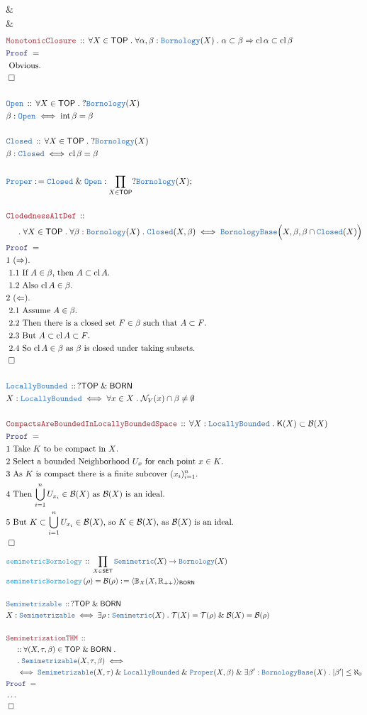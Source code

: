 \documentclass[12pt]{scrartcl}
\newcommand{\TYPE}[1]{\textcolor{NavyBlue}{\mathtt{#1}}}
\newcommand{\FUNC}[1]{\textcolor{Cerulean}{\mathtt{#1}}}
\newcommand{\LOGIC}[1]{\textcolor{Blue}{\mathtt{#1}}}
\newcommand{\THM}[1]{\textcolor{Maroon}{\mathtt{#1}}}
\renewcommand{\.}{\; . \;}
\newcommand{\de}{: \kern 0.1pc =}
\newcommand{\Act}[1]{\left( #1 \right)}
\newcommand{\Theorem}[2]{& \THM{#1} \, :: \, #2 \\ & \Proof = \\ }
\newcommand{\DeclareType}[2]{& \TYPE{#1} \, :: \, #2 \\}
\newcommand{\DefineType}[3]{& #1 : \TYPE{#2} \iff #3 \\}
\newcommand{\DeclareFunc}[2]{& \FUNC{#1} \, :: \, #2 \\}
\newcommand{\DefineNamedFunc}[4]{&  \FUNC{#1}\Act{#2} = #3 \de #4 \\}
\newcommand{\NewLine}{\\ & \kern 1pc}
\newcommand{\Page}[1]{ \begin{align*} #1 \end{align*}   }
\newcommand{\NoProof}{ & \ldots \\ \EndProof}
\newcommand{\Explain}[1]{& \text{#1.} \\}
\renewcommand{\And}{\; \& \;}
\newcommand{\Imply}{\Rightarrow}
\newcommand{\Reals}{\mathbb{R} }
\newcommand{\Conclude}[3]{& #1 \de #2 : #3; \\}
\newcommand{\QED}{\; \square}
\newcommand{\EndProof}{& \QED \\}
\newcommand{\Proof}{\LOGIC{Proof} \; }
\newcommand{\B}{\mathcal{B}}
\newcommand{\SET}{\mathsf{SET}}
\newcommand{\Open}{\TYPE{Open}}
\newcommand{\Closed}{\TYPE{Closed}}
\DeclareMathOperator*{\intx}{int}
\DeclareMathOperator*{\cl}{cl}
\newcommand{\TOP}{\mathsf{TOP}}
\newcommand{\T}{\mathcal{T}}
\newcommand{\N}{\mathcal{N}}
\newcommand{\Cell}{\mathbb{B}}
\newcommand{\K}{\mathsf{K}}
\newcommand{\Born}{\TYPE{Bornology}}
\newcommand{\BB}{\TYPE{BornologyBase}}
\newcommand{\BORN}{\mathsf{BORN}}
\begin{document}
{{		\alpha \subset \beta \Imply
		\intx \alpha \subset \intx \beta
	}
	\Explain{ Obvious}
	\EndProof
}\Page{
	\Theorem{MonotonicClosure}
	{
		\forall X \in \TOP \.
		\forall \alpha, \beta  : \Born(X) \.
		\alpha \subset \beta \Imply
		\cl \alpha \subset \cl \beta
	}
	\Explain{ Obvious}
	\EndProof
	\\
	\DeclareType{Open}
	{
		\forall X \in \TOP \.
		?\Born(X)
	}
	\DefineType{\beta}{\Open}{\intx \beta = \beta}
	\\
	\DeclareType{Closed}
	{
		\forall X \in \TOP \.
		?\Born(X)
	}
	\DefineType{\beta}{\Closed}{\cl \beta = \beta}
	\\
	\Conclude{\TYPE{Proper}}{\TYPE{Closed} \And \TYPE{Open}}
	{
		\prod_{X \in \TOP} ?\Born(X)
	}
	\\
	\Theorem{ClodednessAltDef}
	{
		\NewLine \.		
		\forall X \in \TOP \.
		\forall \beta : \Born(X) \.
		\Closed(X,\beta) \iff
		\BB\Big( X, \beta,  \beta \cap \TYPE{Closed}(X) \Big)
	}
	\Explain{1 $(\Rightarrow)$}
	\Explain{ 1.1 If $A \in \beta$, then $A \subset \cl A$}
	\Explain{ 1.2 Also $\cl A \in \beta$}
	\Explain{2 $(\Leftarrow)$}
	\Explain{ 2.1 Assume $A \in \beta$}
	\Explain{ 2.2 Then there is a closed set $F \in \beta$ such that $A \subset F$}
	\Explain{ 2.3 But $A \subset \cl A \subset F$}
	\Explain{ 2.4 So $\cl A \in \beta$ as $\beta$ is closed under taking subsets}
	\EndProof
	\\
	\DeclareType{LocallyBounded}
	{
		?\TOP \And \BORN
	}
	\DefineType{X}{LocallyBounded}
	{
		\forall x \in X \.\N_V(x) \cap \beta \neq \emptyset
	}
	\\
	\Theorem{CompactsAreBoundedInLocallyBoundedSpace}
	{
		\forall X : \TYPE{LocallyBounded} \.
		\K(X) \subset \B(X)
	}
	\Explain{1 Take $K$ to be compact in $X$}
	\Explain{2 Select a bounded Neighborhood $U_x$ for each point $x \in K$}
	\Explain{3 As $K$ is compact there is a finite subcover $(x_i)_{i=1}^n$}
	\Explain{4 Then $\bigcup^n_{i=1} U_{x_i} \in \B(X)$ as $\B(X)$ is an ideal}
	\Explain{5 But $K \subset \bigcup^n_{i=1} U_{x_i} \in \B(X)$, so $K \in \B(X)$,
		as $\B(X)$ is an ideal}
	\EndProof
}\Page{
	\DeclareFunc{semimetricBornology}
	{
		\prod_{X \in \SET} \TYPE{Semimetric}(X) \to \Born(X)
	}
	\DefineNamedFunc{semimetricBornology}{\rho}{\B(\rho)}
	{
		\langle \Cell_{X}(X,\Reals_{++}) \rangle_\BORN
	}
	\\
	\DeclareType{Semimetrizable}{?\TOP \And \BORN}
	\DefineType{X}{Semimetrizable}
	{
		\exists \rho : \TYPE{Semimetric}(X) \.
		\T(X) = \T(\rho) \And \B(X) = \B(\rho)
	}
	\\
	\Theorem{SemimetrizationTHM}
	{
		\NewLine ::		
		\forall (X,\tau,\beta) \in \TOP \And \BORN \.  \NewLine \.
		\TYPE{Semimetrizable}(X,\tau,\beta)
		\iff \NewLine\iff
		\TYPE{Semimetrizable}(X,\tau)
		\And
		\TYPE{LocallyBounded}\And \TYPE{Proper}(X,\beta)
		\And
		\exists \beta' : \BB(X)  \.
		|\beta'| \le \aleph_0
	}
	\NoProof
}
\newpage
\end{document}
